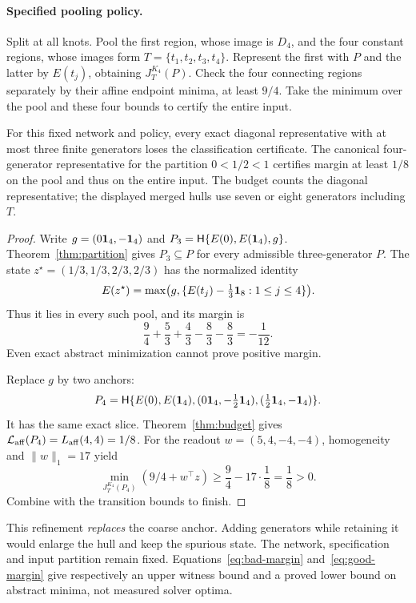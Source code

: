 \paragraph{Specified pooling policy.}
Split at all knots. Pool the first region, whose image is $D_4$, and the four constant regions, whose images form $T=\{t_1,t_2,t_3,t_4\}$. Represent the first with $P$ and the latter by $E(t_j)$, obtaining $J_T^{K_4}(P)$. Check the four connecting regions separately by their affine endpoint minima, at least $9/4$. Take the minimum over the pool and these four bounds to certify the entire input.

\begin{proposition}\label{prop:relu-three-four}
For this fixed network and policy, every exact diagonal representative with at most three finite generators loses the classification certificate. The canonical four-generator representative for the partition $0<1/2<1$ certifies margin at least $1/8$ on the pool and thus on the entire input. The budget counts the diagonal representative; the displayed merged hulls use seven or eight generators including $T$.
\end{proposition}
\begin{proof}
Write $g=(0\mathbf 1_4,-\mathbf 1_4)$ and $P_3=\mathsf H\{E(0),E(\mathbf 1_4),g\}$. Theorem~\ref{thm:partition} gives $P_3\subseteq P$ for every admissible three-generator $P$. The state $z^\star=(1/3,1/3,2/3,2/3)$ has the normalized identity
\[
E(z^\star)=\max\bigl(g,\{E(t_j)-\tfrac13\mathbf 1_8:1\le j\le4\}\bigr).
\]
Thus it lies in every such pool, and its margin is
\begin{equation}\label{eq:bad-margin}
\frac94+\frac53+\frac43-\frac83-\frac83=-\frac1{12}.
\end{equation}
Even exact abstract minimization cannot prove positive margin.

Replace $g$ by two anchors:
\[
P_4=\mathsf H\{E(0),E(\mathbf 1_4),(0\mathbf 1_4,-\tfrac12\mathbf 1_4),
                         (\tfrac12\mathbf 1_4,-\mathbf 1_4)\}.
\]
It has the same exact slice. Theorem~\ref{thm:budget} gives
$\mathcal L_{\rm aff}(P_4)=L_{\mathrm{aff}}(4,4)=1/8$. For the readout $w=(5,4,-4,-4)$, homogeneity and $\|w\|_1=17$ yield
\begin{equation}\label{eq:good-margin}
\min_{J_T^{K_4}(P_4)}(9/4+w^\top z)\ge\frac94-17\cdot\frac18=\frac18>0.
\end{equation}
Combine with the transition bounds to finish.
\end{proof}

This refinement \emph{replaces} the coarse anchor. Adding generators while retaining it would enlarge the hull and keep the spurious state. The network, specification and input partition remain fixed. Equations~\eqref{eq:bad-margin} and~\eqref{eq:good-margin} give respectively an upper witness bound and a proved lower bound on abstract minima, not measured solver optima.

